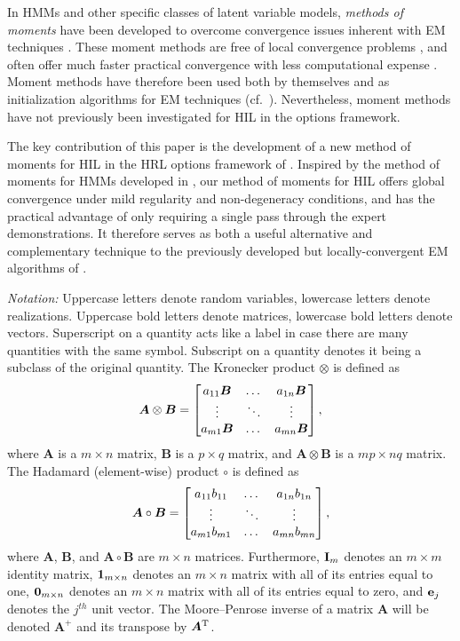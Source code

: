 In HMMs and other specific classes of latent variable models, \emph{methods of moments} have been developed to overcome convergence issues inherent with EM techniques \citep{hsu08,HsuKakade13,Mattila2020,Mattila2015,Mattila2017,Anandkumar2014,Parikh2012}.
These moment methods are free of local convergence problems \citep{Mattila2020,Anandkumar2014}, and often offer much faster practical convergence with less computational expense \citep{Mattila2015,Mattila2017}.
Moment methods have therefore been used both by themselves and as initialization algorithms for EM techniques (cf.~\citep{Zhang2016}).
Nevertheless, moment methods have not previously been investigated for HIL in the options framework.

The key contribution of this paper is the development of a new method of moments for HIL in the HRL options framework of \citep{SUTTON1999181}. Inspired by the method of moments for HMMs developed in \citep{hsu08}, our method of moments for HIL offers global convergence under mild regularity and non-degeneracy conditions, and has the practical advantage of only requiring a single pass through the expert demonstrations.
It therefore serves as both a useful alternative and complementary technique to the previously developed but locally-convergent EM algorithms of \citep{Daniel2016,Giammarino_2021, zhiyu20}.

\emph{Notation:}
Uppercase letters denote random variables, lowercase letters denote realizations. Uppercase bold letters denote matrices, lowercase bold letters denote vectors. Superscript on a quantity acts like a label in case there are many quantities with the same symbol. Subscript on a quantity denotes it being a subclass of the original quantity.
The Kronecker product $\otimes$ is defined as
\[
    \bm{A}\otimes \bm{B}=\bmat{a_{11}\bm{B}&\dots&a_{1n}\bm{B}\\ \vdots&\ddots&\vdots\\ a_{m1}\bm{B}&\dots&a_{mn}\bm{B}},
\]
where $\bm A$ is a $m\times n$ matrix, $\bm B$ is a $p\times q$ matrix, 
and $\bm{A}\otimes \bm{B}$ is a $mp\times nq$ matrix.
The Hadamard (element-wise) product $\circ$ is defined as
\[
    \bm{A}\circ \bm{B}=\bmat{a_{11}b_{11}&\dots&a_{1n}b_{1n}\\ \vdots&\ddots&\vdots\\
    a_{m1}b_{m1}&\dots&a_{mn}b_{mn}},
\]
where $\bm A$, $\bm B$, and $\bm{A}\circ \bm{B}$ are $m\times n$ matrices.
Furthermore, $\mathbf{I}_m$ denotes an $m\times m$ identity matrix, 
$\bm{\mathrm{1}}_{m\times n}$ denotes an $m\times n$ matrix with all of its entries equal to one, $\bm{\mathrm{0}}_{m\times n}$ denotes an $m\times n$ matrix with all of its entries equal to zero, and $\bm{\mathrm{e}}_j$ denotes the $j^{th}$ unit vector.
The Moore–Penrose inverse of a matrix $\bm A$ will be denoted $\bm A^+$ and its transpose by ${\bm A}^{\mathrm{T}}$.

